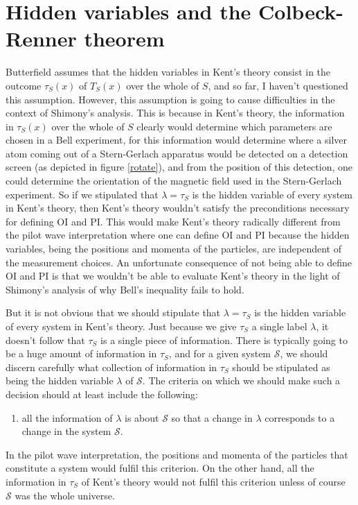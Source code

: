 \section{Hidden variables and the Colbeck-Renner theorem}
Butterfield assumes that the hidden variables in Kent's theory consist in the outcome $\tau_S(x)$ of $T_S(x)$ over the whole of $S$, and so far, I haven't questioned this assumption. However, this assumption is going to cause difficulties in the context of Shimony's analysis. This is because in Kent's theory, the information in $\tau_S(x)$ over the whole of $S$ clearly would determine which parameters are chosen in a Bell experiment, for this information would determine where a silver atom coming out of a Stern-Gerlach apparatus would be detected on a detection screen (as depicted in figure \ref{rotate}), and from the position of this detection, one could determine the orientation of the magnetic field used in the Stern-Gerlach experiment. So if we stipulated that $\lambda=\tau_S$ is the hidden variable of every system in Kent's theory, then Kent's theory wouldn't satisfy the preconditions necessary for defining OI and PI. This would make Kent's theory radically different from the pilot wave interpretation where one can define OI and PI because the hidden variables, being the positions and momenta of the particles, are independent of the measurement choices. An unfortunate consequence of not being able to define OI and PI is that we wouldn't be able to evaluate Kent's theory in the light of Shimony's analysis of why Bell's inequality fails to hold. 

But it is not obvious that we should stipulate that $\lambda=\tau_S$ is the hidden variable of every system in Kent's theory. Just because we give $\tau_S$ a single label $\lambda$, it doesn't follow that $\tau_S$ is a single piece of information. There is typically going to be a huge amount of information in $\tau_S$, and for a given system $\mathcal{S}$, we should  discern carefully what collection of information in $\tau_S$ should be stipulated as being the hidden variable $\lambda$ of $\mathcal{S}$. The criteria on which we should make such a decision should at least include the following:
\begin{enumerate}
	\item all the information of $\lambda$ is about $\mathcal{S}$ so that a change in $\lambda$ corresponds to a change in the system $\mathcal{S}$.\label{hidden1}
\end{enumerate} 
In the pilot wave interpretation, the positions and momenta of the particles that constitute a system would fulfil this criterion. On the other hand, all the information in $\tau_S$ of Kent's theory would not fulfil this criterion unless of course $\mathcal{S}$ was the whole universe. 

